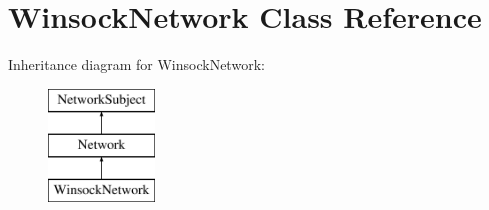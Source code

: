\hypertarget{classWinsockNetwork}{
\section{WinsockNetwork Class Reference}
\label{classWinsockNetwork}
}
Inheritance diagram for WinsockNetwork:\begin{figure}[H]
\begin{center}
\leavevmode
\includegraphics[height=3.000000cm]{classWinsockNetwork}
\end{center}
\end{figure}
